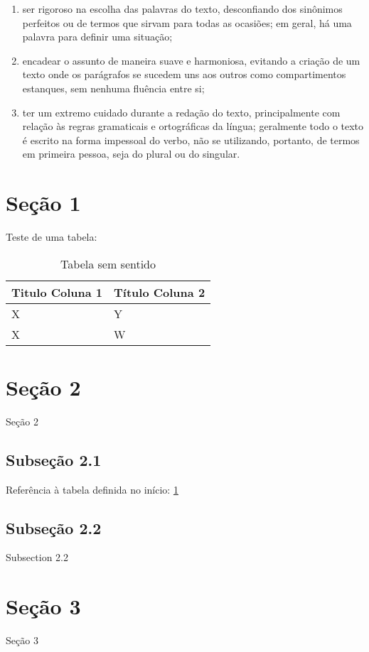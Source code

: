 \begin{enumerate}
	\item ser rigoroso na escolha das palavras do texto, desconfiando dos sinônimos perfeitos ou de termos que sirvam para todas as ocasiões; em geral, há uma palavra para definir uma situação;
	\item encadear o assunto de maneira suave e harmoniosa, evitando a criação de um texto onde os parágrafos se sucedem uns aos outros como compartimentos estanques, sem nenhuma fluência entre si;
	\item ter um extremo cuidado durante a redação do texto, principalmente com relação às regras gramaticais e ortográficas da língua; geralmente todo o texto é escrito na forma impessoal do verbo, não se utilizando, portanto, de termos em primeira pessoa, seja do plural ou do singular.
\end{enumerate}


\section{Seção 1}

Teste de uma tabela:

\begin{table}[htb]
\caption{Tabela sem sentido}
\label{tab:TabelaSemSentido}
\center
{
	\begin{tabular}{l|l}
		\hline
		Titulo Coluna 1   & Título Coluna 2\\
		\hline
		X                 & Y\\
		X                 & W\\
		\hline
	\end{tabular}
}
\end{table}


\section{Seção 2}

Seção 2


\subsection{Subseção 2.1}

Referência à tabela definida no início: \ref{tab:TabelaSemSentido}


\subsection{Subseção 2.2}

Subsection 2.2


\section{Seção 3}

Seção 3